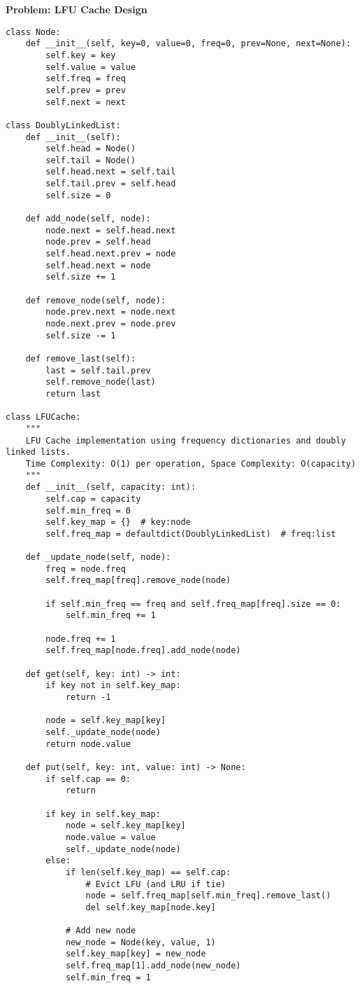 \noindent\textbf{Problem: LFU Cache Design}
\begin{verbatim}
class Node:
    def __init__(self, key=0, value=0, freq=0, prev=None, next=None):
        self.key = key
        self.value = value
        self.freq = freq
        self.prev = prev
        self.next = next

class DoublyLinkedList:
    def __init__(self):
        self.head = Node()
        self.tail = Node()
        self.head.next = self.tail
        self.tail.prev = self.head
        self.size = 0

    def add_node(self, node):
        node.next = self.head.next
        node.prev = self.head
        self.head.next.prev = node
        self.head.next = node
        self.size += 1

    def remove_node(self, node):
        node.prev.next = node.next
        node.next.prev = node.prev
        self.size -= 1

    def remove_last(self):
        last = self.tail.prev
        self.remove_node(last)
        return last

class LFUCache:
    """
    LFU Cache implementation using frequency dictionaries and doubly linked lists.
    Time Complexity: O(1) per operation, Space Complexity: O(capacity)
    """
    def __init__(self, capacity: int):
        self.cap = capacity
        self.min_freq = 0
        self.key_map = {}  # key:node
        self.freq_map = defaultdict(DoublyLinkedList)  # freq:list

    def _update_node(self, node):
        freq = node.freq
        self.freq_map[freq].remove_node(node)
        
        if self.min_freq == freq and self.freq_map[freq].size == 0:
            self.min_freq += 1
        
        node.freq += 1
        self.freq_map[node.freq].add_node(node)

    def get(self, key: int) -> int:
        if key not in self.key_map:
            return -1
        
        node = self.key_map[key]
        self._update_node(node)
        return node.value

    def put(self, key: int, value: int) -> None:
        if self.cap == 0:
            return
            
        if key in self.key_map:
            node = self.key_map[key]
            node.value = value
            self._update_node(node)
        else:
            if len(self.key_map) == self.cap:
                # Evict LFU (and LRU if tie)
                node = self.freq_map[self.min_freq].remove_last()
                del self.key_map[node.key]
            
            # Add new node
            new_node = Node(key, value, 1)
            self.key_map[key] = new_node
            self.freq_map[1].add_node(new_node)
            self.min_freq = 1
\end{verbatim}

% 
